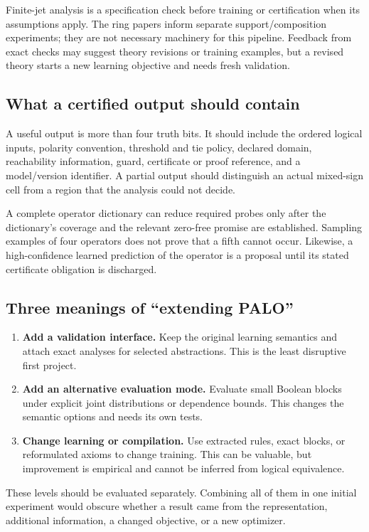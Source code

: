 \documentclass[11pt,a4paper]{article}
\theoremstyle{remark}
\begin{document}
Finite-jet analysis is a specification check before training or certification when its assumptions apply. The ring papers inform separate support/composition experiments; they are not necessary machinery for this pipeline. Feedback from exact checks may suggest theory revisions or training examples, but a revised theory starts a new learning objective and needs fresh validation.

\subsection{What a certified output should contain}
A useful output is more than four truth bits. It should include the ordered logical inputs, polarity convention, threshold and tie policy, declared domain, reachability information, guard, certificate or proof reference, and a model/version identifier. A partial output should distinguish an actual mixed-sign cell from a region that the analysis could not decide.

A complete operator dictionary can reduce required probes only after the dictionary's coverage and the relevant zero-free promise are established. Sampling examples of four operators does not prove that a fifth cannot occur. Likewise, a high-confidence learned prediction of the operator is a proposal until its stated certificate obligation is discharged.

\subsection{Three meanings of ``extending PALO''}
\begin{enumerate}
\item \textbf{Add a validation interface.} Keep the original learning semantics and attach exact analyses for selected abstractions. This is the least disruptive first project.
\item \textbf{Add an alternative evaluation mode.} Evaluate small Boolean blocks under explicit joint distributions or dependence bounds. This changes the semantic options and needs its own tests.
\item \textbf{Change learning or compilation.} Use extracted rules, exact blocks, or reformulated axioms to change training. This can be valuable, but improvement is empirical and cannot be inferred from logical equivalence.
\end{enumerate}

These levels should be evaluated separately. Combining all of them in one initial experiment would obscure whether a result came from the representation, additional information, a changed objective, or a new optimizer.
\end{document}

